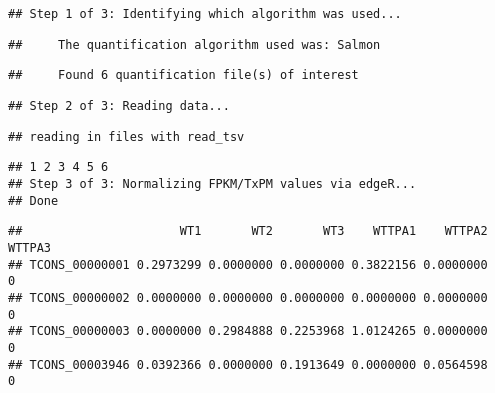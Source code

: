 \documentclass[]{article}
\newenvironment{Shaded}{\begin{snugshade}}{\end{snugshade}}
\newcommand{\DecValTok}[1]{\textcolor[rgb]{0.00,0.00,0.81}{#1}}
\newcommand{\KeywordTok}[1]{\textcolor[rgb]{0.13,0.29,0.53}{\textbf{#1}}}
\newcommand{\NormalTok}[1]{#1}
\newcommand{\OperatorTok}[1]{\textcolor[rgb]{0.81,0.36,0.00}{\textbf{#1}}}
\newcommand{\StringTok}[1]{\textcolor[rgb]{0.31,0.60,0.02}{#1}}
\begin{document}
\begin{verbatim}
## Step 1 of 3: Identifying which algorithm was used...
\end{verbatim}

\begin{verbatim}
##     The quantification algorithm used was: Salmon
\end{verbatim}

\begin{verbatim}
##     Found 6 quantification file(s) of interest
\end{verbatim}

\begin{verbatim}
## Step 2 of 3: Reading data...
\end{verbatim}

\begin{verbatim}
## reading in files with read_tsv
\end{verbatim}

\begin{verbatim}
## 1 2 3 4 5 6 
## Step 3 of 3: Normalizing FPKM/TxPM values via edgeR...
## Done
\end{verbatim}

\begin{Shaded}
\end{Shaded}

\begin{verbatim}
##                      WT1       WT2       WT3    WTTPA1    WTTPA2 WTTPA3
## TCONS_00000001 0.2973299 0.0000000 0.0000000 0.3822156 0.0000000      0
## TCONS_00000002 0.0000000 0.0000000 0.0000000 0.0000000 0.0000000      0
## TCONS_00000003 0.0000000 0.2984888 0.2253968 1.0124265 0.0000000      0
## TCONS_00003946 0.0392366 0.0000000 0.1913649 0.0000000 0.0564598      0
\end{verbatim}
\end{document}
